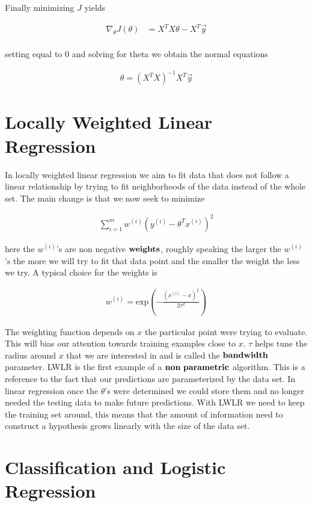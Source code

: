 \documentclass[11pt]{exam}
\newcommand{\idx}[2]{#1^{(#2)}}
\begin{document}
Finally minimizing $J$ yields

\begin{align*}
\nabla_\theta J(\theta) &= X^TX\theta - X^T\vec{y}\\
\end{align*}

setting equal to 0 and solving for theta we obtain the normal equations 

\begin{align*}
\theta = (X^TX)^{-1}X^T\vec{y}
\end{align*}


\section{Locally Weighted Linear Regression }

In locally weighted linear regression we aim to fit data that does not follow a linear relationship by trying to fit neighborhoods of the data instead of the whole set. The main change is that we now seek to minimize

\begin{align*}
\sum_{i=1}^m \idx{w}{i}(\idx{y}{i} - \theta^T\idx{x}{i})^2
\end{align*} 

here the $\idx{w}{i}$'s are non negative $\bf{weights}$, roughly speaking the larger the $\idx{w}{i}$'s the more we will try to fit that data point and the smaller the weight the less we try. A typical choice for the weights is

\begin{align*}
\idx{w}{i} = \text{exp}(-\frac{(\idx{x}{i} - x)^2}{2\tau^2})
\end{align*}

The weighting function depends on $x$ the particular point were trying to evaluate. This will bias our attention towards training examples close to $x$. $\tau$ helps tune the radius around $x$ that we are interested in and is called the $\bf{bandwidth}$ parameter. LWLR is the first example of a $\bf{non \ parametric}$ algorithm. This is a reference to the fact that our predictions are parameterized by the data set. In linear regression once the $\theta$'s were determined we could store them and no longer needed the testing data to make future predictions. With LWLR we need to keep the training set around, this means that the amount of information need to construct a hypothesis grows linearly with the size of the data set.

\section{Classification and Logistic Regression}
\end{document}
